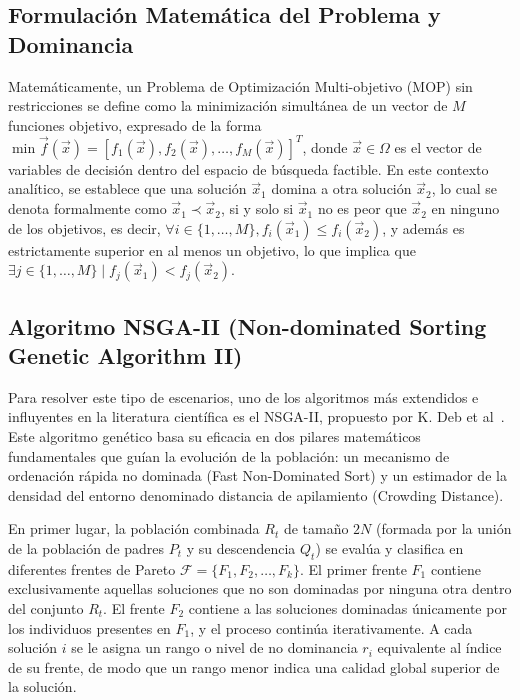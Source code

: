 \documentclass[12pt,a4paper,twoside,openright]{book}
\begin{document}
    \subsection{Formulación Matemática del Problema y Dominancia}
        Matemáticamente, un Problema de Optimización Multi-objetivo (MOP) sin restricciones se define como la minimización simultánea de un vector de $M$ funciones objetivo, expresado de la forma $\min \vec{f}(\vec{x}) = [f_1(\vec{x}), f_2(\vec{x}), \dots, f_M(\vec{x})]^T$, donde $\vec{x} \in \Omega$ es el vector de variables de decisión dentro del espacio de búsqueda factible. En este contexto analítico, se establece que una solución $\vec{x}_1$ domina a otra solución $\vec{x}_2$, lo cual se denota formalmente como $\vec{x}_1 \prec \vec{x}_2$, si y solo si $\vec{x}_1$ no es peor que $\vec{x}_2$ en ninguno de los objetivos, es decir, $\forall i \in \{1, \dots, M\}, f_i(\vec{x}_1) \leq f_i(\vec{x}_2)$, y además es estrictamente superior en al menos un objetivo, lo que implica que $\exists j \in \{1, \dots, M\} \mid f_j(\vec{x}_1) < f_j(\vec{x}_2)$.
    
    \subsection{Algoritmo NSGA-II (Non-dominated Sorting Genetic Algorithm II)}
        Para resolver este tipo de escenarios, uno de los algoritmos más extendidos e influyentes en la literatura científica es el NSGA-II, propuesto por K. Deb et al~\cite{deb2002fast}. Este algoritmo genético basa su eficacia en dos pilares matemáticos fundamentales que guían la evolución de la población: un mecanismo de ordenación rápida no dominada (Fast Non-Dominated Sort) y un estimador de la densidad del entorno denominado distancia de apilamiento (Crowding Distance).
    
        En primer lugar, la población combinada $R_t$ de tamaño $2N$ (formada por la unión de la población de padres $P_t$ y su descendencia $Q_t$) se evalúa y clasifica en diferentes frentes de Pareto $\mathcal{F} = \{F_1, F_2, \dots, F_k\}$. El primer frente $F_1$ contiene exclusivamente aquellas soluciones que no son dominadas por ninguna otra dentro del conjunto $R_t$. El frente $F_2$ contiene a las soluciones dominadas únicamente por los individuos presentes en $F_1$, y el proceso continúa iterativamente. A cada solución $i$ se le asigna un rango o nivel de no dominancia $r_i$ equivalente al índice de su frente, de modo que un rango menor indica una calidad global superior de la solución.
    
\end{document}
